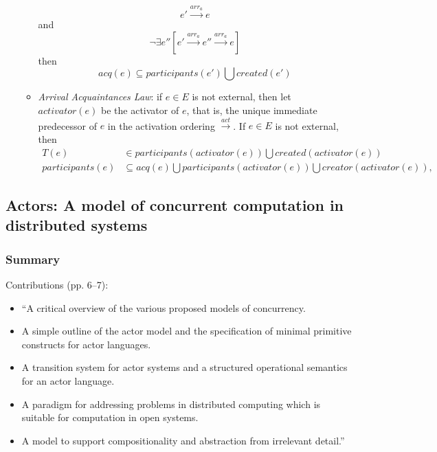 \begin{itemize}
\begin{itemize}
		\begin{equation*}
			e' \overset{arr_a}{\longrightarrow} e
		\end{equation*}
	and
		\begin{equation*}
			\lnot \exists e'' [e' \overset{arr_a}{\longrightarrow} e'' \overset{arr_a}{\longrightarrow} e]
		\end{equation*}
	then
		\begin{equation*}
			\mathit{acq}(e) \subseteq \mathit{participants(e') \bigcup \mathit{created}(e')}
		\end{equation*}
	\item \emph{Arrival Acquaintances Law}: if $e \in E$ is not external, then let $\mathit{activator}(e)$ be the activator of $e$, that is, the unique immediate predecessor of $e$ in the activation ordering $\overset{act}{\rightarrow}$. If $e \in E$ is not external, then
		\begin{align*}
			T(e) &\in \mathit{participants}(\mathit{activator}(e)) \bigcup \mathit{created}(\mathit{activator}(e)) \\[10pt]
			\mathit{participants}(e) &\subseteq \mathit{acq}(e) \bigcup \mathit{participants}(\mathit{activator}(e)) \bigcup \mathit{creator}(\mathit{activator}(e)),
		\end{align*}
	\end{itemize}
\end{itemize}

\subsection{Actors: A model of concurrent computation in distributed systems}
\subsubsection*{Summary}
Contributions (pp. 6--7):
	\begin{itemize}
	\item ``A critical overview of the various proposed models of concurrency.
	\item A simple outline of the actor model and the specification of minimal primitive constructs for actor languages.
	\item A transition system for actor systems and a structured operational semantics for an actor language.
	\item A paradigm for addressing problems in distributed computing which is suitable for computation in open systems.
	\item A model to support compositionality and abstraction from irrelevant detail.''
	\end{itemize}

